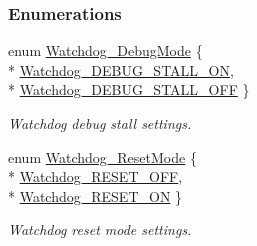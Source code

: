 \subsubsection*{Enumerations}
\begin{DoxyCompactItemize}
\item 
enum \hyperlink{_watchdog_8h_ab1aa5862661c88a16b9d7bc12709d51e}{Watchdog\+\_\+\+Debug\+Mode} \{ \\*
\hyperlink{_watchdog_8h_ab1aa5862661c88a16b9d7bc12709d51ea787c87976091a6f294070dadd1747ed0}{Watchdog\+\_\+\+D\+E\+B\+U\+G\+\_\+\+S\+T\+A\+L\+L\+\_\+\+O\+N}, 
\\*
\hyperlink{_watchdog_8h_ab1aa5862661c88a16b9d7bc12709d51ea745be9d89bc0c15eda5c4082020f8bb2}{Watchdog\+\_\+\+D\+E\+B\+U\+G\+\_\+\+S\+T\+A\+L\+L\+\_\+\+O\+F\+F}
 \}
\begin{DoxyCompactList}\small\item\em Watchdog debug stall settings. \end{DoxyCompactList}\item 
enum \hyperlink{_watchdog_8h_ada0db7216129d7dad494bb0cd0169f88}{Watchdog\+\_\+\+Reset\+Mode} \{ \\*
\hyperlink{_watchdog_8h_ada0db7216129d7dad494bb0cd0169f88a78ba6b49345f0116143f4d4e7a9ec488}{Watchdog\+\_\+\+R\+E\+S\+E\+T\+\_\+\+O\+F\+F}, 
\\*
\hyperlink{_watchdog_8h_ada0db7216129d7dad494bb0cd0169f88aafccd6330c396d9ffc2786524625bf1f}{Watchdog\+\_\+\+R\+E\+S\+E\+T\+\_\+\+O\+N}
 \}
\begin{DoxyCompactList}\small\item\em Watchdog reset mode settings. \end{DoxyCompactList}\end{DoxyCompactItemize}
